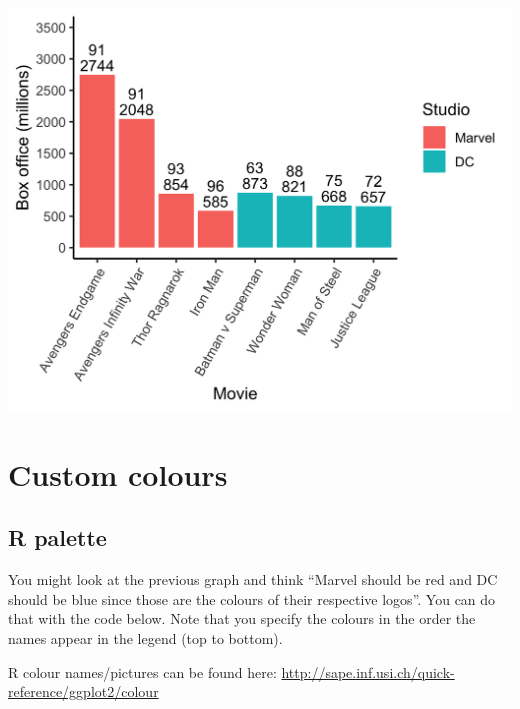 \documentclass[
]{krantz}
\begin{document}
\includegraphics[width=0.85\linewidth]{ch_graphing/images/custom_order2}

\hypertarget{custom-colours}{%
\section{Custom colours}\label{custom-colours}}

\hypertarget{r-palette}{%
\subsection{R palette}\label{r-palette}}

You might look at the previous graph and think ``Marvel should be red and DC should be blue since those are the colours of their respective logos''. You can do that with the code below. Note that you specify the colours in the order the names appear in the legend (top to bottom).

R colour names/pictures can be found here: \url{http://sape.inf.usi.ch/quick-reference/ggplot2/colour}
\end{document}
